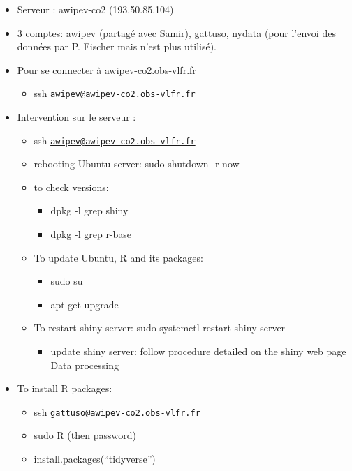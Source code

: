 \documentclass[
]{article}
\providecommand{\tightlist}{%
  \setlength{\itemsep}{0pt}\setlength{\parskip}{0pt}}
\begin{document}
\begin{itemize}
\tightlist
\item
  Serveur : awipev-co2 (193.50.85.104)
\item
  3 comptes: awipev (partagé avec Samir), gattuso, nydata (pour l'envoi
  des données par P. Fischer mais n'est plus utilisé).
\item
  Pour se connecter à awipev-co2.obs-vlfr.fr

  \begin{itemize}
  \tightlist
  \item
    ssh
    \href{mailto:awipev@awipev-co2.obs-vlfr.fr}{\nolinkurl{awipev@awipev-co2.obs-vlfr.fr}}
  \end{itemize}
\item
  Intervention sur le serveur :

  \begin{itemize}
  \tightlist
  \item
    ssh
    \href{mailto:awipev@awipev-co2.obs-vlfr.fr}{\nolinkurl{awipev@awipev-co2.obs-vlfr.fr}}
  \item
    rebooting Ubuntu server: sudo shutdown -r now
  \item
    to check versions:

    \begin{itemize}
    \tightlist
    \item
      dpkg -l \textbar{} grep shiny
    \item
      dpkg -l \textbar{} grep r-base
    \end{itemize}
  \item
    To update Ubuntu, R and its packages:

    \begin{itemize}
    \tightlist
    \item
      sudo su
    \item
      apt-get upgrade
    \end{itemize}
  \item
    To restart shiny server: sudo systemctl restart shiny-server

    \begin{itemize}
    \tightlist
    \item
      update shiny server: follow procedure detailed on the shiny web
      page Data processing
    \end{itemize}
  \end{itemize}
\item
  To install R packages:

  \begin{itemize}
  \tightlist
  \item
    ssh
    \href{mailto:gattuso@awipev-co2.obs-vlfr.fr}{\nolinkurl{gattuso@awipev-co2.obs-vlfr.fr}}
  \item
    sudo R (then password)
  \item
    install.packages(``tidyverse'')
  \end{itemize}
\end{itemize}
\end{document}
